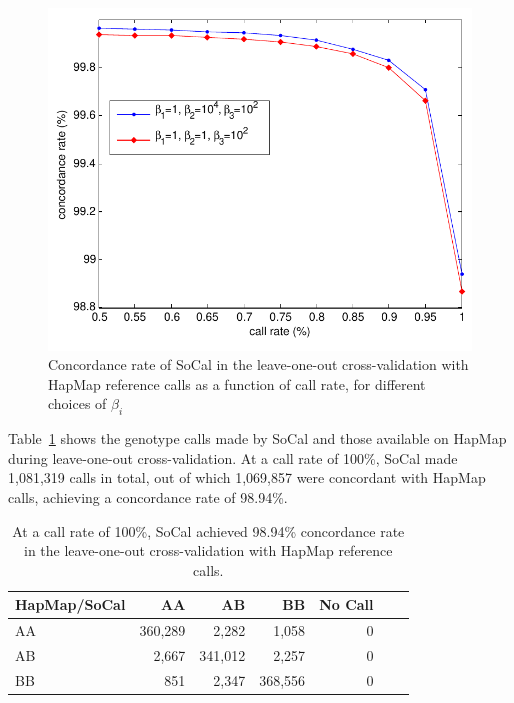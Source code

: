\documentclass{scrartcl}
\begin{document}
\begin{figure}[H]
\centering
\includegraphics[scale=0.75]
{result_figs/cmp_socal_hapmap/cmp_socal_hapmap_cr_vs_acc.pdf}
\caption{Concordance rate of SoCal in the leave-one-out cross-validation with
HapMap reference calls as a function of call rate, for different choices of
$\beta_i$}
\label{fig:result_sh_crvacc}
\end{figure}

\par
Table~\ref{table:cmp_hapmap_socal_100} shows the genotype calls made by SoCal
and those available on HapMap during leave-one-out cross-validation.
At a call rate of 100\%, SoCal made 1,081,319 calls in total, out of which
1,069,857 were concordant with HapMap calls, achieving a concordance
rate of 98.94\%.

\begin{table}[H]
\centering
\begin{tabular}{l*{5}{r}r}
    \hline
    HapMap/SoCal  & AA       & AB      & BB      & No Call \\ \hline
    AA            & 360,289  & 2,282   & 1,058   & 0  \\
    AB            & 2,667    & 341,012 & 2,257   & 0  \\
    BB            & 851      & 2,347   & 368,556 & 0  \\ \hline
\end{tabular}
\caption{At a call rate of 100\%, SoCal achieved 98.94\% concordance rate
in the leave-one-out cross-validation with HapMap reference calls.}
\label{table:cmp_hapmap_socal_100}
\end{table}
\end{document}
